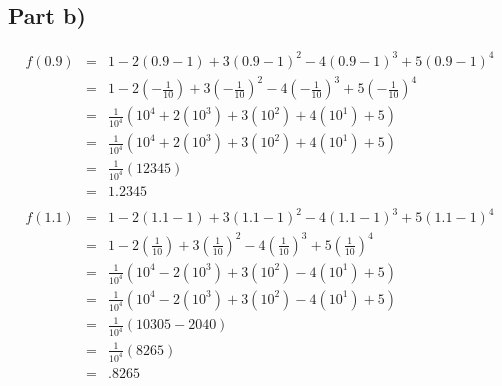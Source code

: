 \documentclass[12pt]{article}
\begin{document}
\subsection*{Part b)}
\begin{eqnarray*}
f(0.9) & = & 1 - 2(0.9-1) + 3(0.9-1)^{2} - 4(0.9-1)^{3} + 5(0.9-1)^{4}\\
& = & 1 - 2(-\frac{1}{10}) + 3(-\frac{1}{10})^{2} - 4(-\frac{1}{10})^{3} + 5(-\frac{1}{10})^{4}\\
& = & \frac{1}{10^{4}}(10^4 + 2(10^{3}) + 3(10^{2}) + 4(10^{1}) + 5)\\
& = & \frac{1}{10^{4}}(10^4 + 2(10^{3}) + 3(10^{2}) + 4(10^{1}) + 5)\\
& = & \frac{1}{10^{4}}(12345)\\
& = & 1.2345\\
\\
f(1.1) & = & 1 - 2(1.1-1) + 3(1.1-1)^{2} - 4(1.1-1)^{3} + 5(1.1-1)^{4}\\
& = & 1 - 2(\frac{1}{10}) + 3(\frac{1}{10})^{2} - 4(\frac{1}{10})^{3} + 5(\frac{1}{10})^{4}\\
& = & \frac{1}{10^{4}}(10^4 - 2(10^{3}) + 3(10^{2}) - 4(10^{1}) + 5)\\
& = & \frac{1}{10^{4}}(10^4 - 2(10^{3}) + 3(10^{2}) - 4(10^{1}) + 5)\\
& = & \frac{1}{10^{4}}(10305 - 2040)\\
& = & \frac{1}{10^{4}}(8265)\\
& = & .8265\\
\end{eqnarray*}
\end{document}
